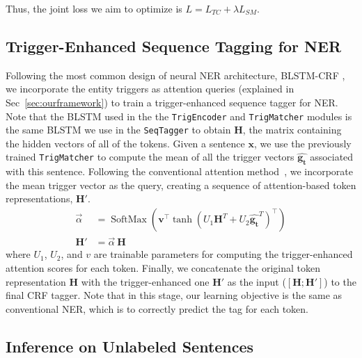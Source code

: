 Thus, the joint loss we aim to optimize is $L = L_{TC} + \lambda L_{SM}$.



\subsection{Trigger-Enhanced Sequence Tagging for NER}
\label{sec:secondstage}
Following the most common design of neural NER architecture, BLSTM-CRF \citep{DBLP:conf/acl/MaH16}, we incorporate the entity triggers as attention queries (explained in Sec~\ref{sec:ourframework})
to train a trigger-enhanced sequence tagger for NER. Note that the BLSTM used in the the \texttt{TrigEncoder} and \texttt{TrigMatcher} modules is the same BLSTM we use in the \texttt{SeqTagger} to obtain $\mathbf{H}$, the matrix containing the hidden vectors of all of the tokens.
Given a sentence $\mathbf{x}$, we use the previously trained \texttt{TrigMatcher} to compute the mean of all the trigger vectors $\hat{\mathbf{g_t}}$ associated with this sentence.
Following the conventional attention method~\citep{luong2015effective}, 
we incorporate the mean trigger vector as the query, creating a sequence of attention-based token representations, $\mathbf{H}'$.
{
    {
        \begin{align*} 
            \vec{\alpha}  &= \operatorname{SoftMax}\left(\boldsymbol{v}^{\top} \tanh \left({U}_{1}\mathbf{H}^T + {U}_{2}\hat{\mathbf{g_t}}^T \right)^{\top}\right)\\
            \mathbf{H'} &=  \vec{\alpha}~\mathbf{H}
        \end{align*} 
    }
}
\noindent
where $U_1$, $U_2$, and $v$ are trainable parameters for computing the trigger-enhanced attention scores for each token.
Finally, we concatenate the original token representation $\mathbf{H}$ with the trigger-enhanced one $\mathbf{H}'$ as the input ($[\mathbf{H};\mathbf{H}']$) to the final CRF tagger.
Note that in this stage, our learning objective is the same as conventional NER, which is to correctly predict the tag for each token.




\subsection{Inference on Unlabeled Sentences}
\label{sec:inference}

